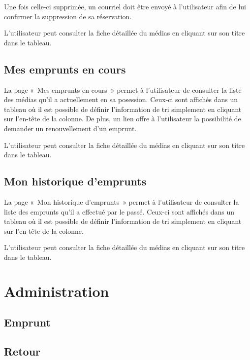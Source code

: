 \documentclass[letter, 11pt]{report}
\begin{document}
Une fois celle-ci supprimée, un courriel doit être envoyé à l'utilisateur afin de lui confirmer la suppression de sa réservation.

L'utilisateur peut consulter la fiche détaillée du médias en cliquant sur son titre dans le tableau.

\subsection{Mes emprunts en cours}
La page «~Mes emprunts en cours~» permet à l'utilisateur de consulter la liste des médias qu'il a actuellement en sa posession. Ceux-ci sont affichés dans un tableau où il est possible de définir l'information de tri simplement en cliquant sur l'en-tête de la colonne. De plus, un lien offre à l'utilisateur la possibilité de demander un renouvellement d'un emprunt.

L'utilisateur peut consulter la fiche détaillée du médias en cliquant sur son titre dans le tableau.

\subsection{Mon historique d'emprunts}

La page «~Mon historique d'emprunts~» permet à l'utilisateur de consulter la liste des emprunts qu'il a effectué par le passé. Ceux-ci sont affichés dans un tableau où il est possible de définir l'information de tri simplement en cliquant sur l'en-tête de la colonne.

L'utilisateur peut consulter la fiche détaillée du médias en cliquant sur son titre dans le tableau.

\section{Administration}

\subsection{Emprunt}

\subsection{Retour}
\end{document}
